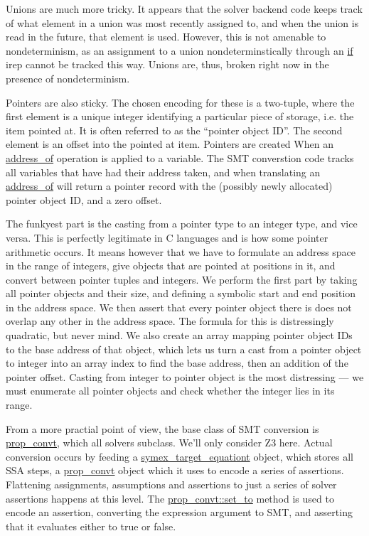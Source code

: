 \documentclass{article}
\begin{document}
Unions are much more tricky. It appears that the solver backend code keeps track
of what element in a union was most recently assigned to, and when the union
is read in the future, that element is used. However, this is not amenable
to nondeterminism, as an assignment to a union nondeterminstically through an
\url{if} irep cannot be tracked this way. Unions are, thus, broken right
now in the presence of nondeterminism.

Pointers are also sticky. The chosen encoding for these is a two-tuple, where
the first element is a unique integer identifying a particular piece of storage,
i.e. the item pointed at. It is often referred to as the ``pointer object ID''.
The second element is an offset into the pointed at item. Pointers are created
When an \url{address_of} operation is applied to a variable. The SMT
converstion code tracks all variables that have had their address taken, and
when translating an \url{address_of} will return a pointer record with the
(possibly newly allocated) pointer object ID, and a zero offset.

The funkyest part is the casting from a pointer type to an integer type, and
vice versa. This is perfectly legitimate in C languages and is how some pointer
arithmetic occurs. It means however that we have to formulate an address
space in the range of integers, give objects that are pointed at positions
in it, and convert between pointer tuples and integers. We perform the first
part by taking all pointer objects and their size, and defining a symbolic start
and end position in the address space. We then assert that every pointer object
there is does not overlap any other in the address space. The formula for this
is distressingly quadratic, but never mind. We also create an array mapping
pointer object IDs to the base address of that object, which lets us turn
a cast from a pointer object to integer into an array index to find the base
address, then an addition of the pointer offset. Casting from integer to
pointer object is the most distressing --- we must enumerate all pointer
objects and check whether the integer lies in its range.

From a more practial point of view, the base class of SMT conversion is
\url{prop_convt}, which all solvers subclass. We'll only consider Z3 here.
Actual conversion occurs by feeding a \url{symex_target_equationt} object,
which stores all SSA steps, a \url{prop_convt} object which it uses to
encode a series of assertions. Flattening assignments, assumptions and
assertions to just a series of solver assertions happens at this level. The
\url{prop_convt::set_to} method is used to encode an assertion, converting
the expression argument to SMT, and asserting that it evaluates either to
true or false.
\end{document}
